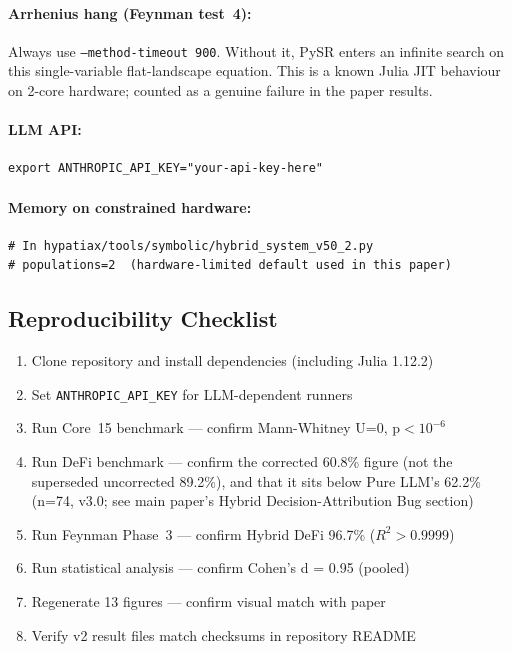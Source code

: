\documentclass[twoside,11pt]{article}
\begin{document}
\paragraph{Arrhenius hang (Feynman test~4):}
Always use \texttt{--method-timeout 900}. Without it, PySR enters an
infinite search on this single-variable flat-landscape equation.
This is a known Julia JIT behaviour on 2-core hardware; counted as a
genuine failure in the paper results.

\paragraph{LLM API:}
\begin{small}
\begin{verbatim}
export ANTHROPIC_API_KEY="your-api-key-here"
\end{verbatim}
\end{small}

\paragraph{Memory on constrained hardware:}
\begin{small}
\begin{verbatim}
# In hypatiax/tools/symbolic/hybrid_system_v50_2.py
# populations=2  (hardware-limited default used in this paper)
\end{verbatim}
\end{small}

\subsection{Reproducibility Checklist}

\begin{enumerate}
\item Clone repository and install dependencies (including Julia 1.12.2)
\item Set \texttt{ANTHROPIC\_API\_KEY} for LLM-dependent runners
\item Run Core~15 benchmark — confirm Mann-Whitney U=0, p$<10^{-6}$
\item Run DeFi benchmark --- confirm the corrected 60.8\% figure (not the
  superseded uncorrected 89.2\%), and that it sits below Pure LLM's
  62.2\% (n=74, v3.0; see main paper's Hybrid Decision-Attribution Bug
  section)
\item Run Feynman Phase~3 — confirm Hybrid DeFi 96.7\% ($R^2>0.9999$)
\item Run statistical analysis — confirm Cohen's d = 0.95 (pooled)
\item Regenerate 13 figures — confirm visual match with paper
\item Verify v2 result files match checksums in repository README
\end{enumerate}
\end{document}
